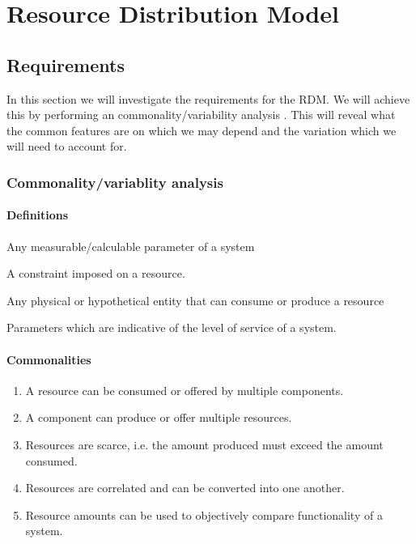 \newcommand{\rdmid}{2}
\chapter{Resource Distribution Model}
\section{Requirements}
In this section we will investigate the requirements for the RDM. We will achieve this by performing an commonality/variability analysis \cite{var_invar}. This will reveal what the common features are on which we may depend and the variation which we will need to account for.
\subsection{Commonality/variablity analysis}
\subsubsection{Definitions}
\begin{description}
\nospace
\item[Resource:] Any measurable/calculable parameter of a system
\item[Resource constraint:] A constraint imposed on a resource.
\item[Component:] Any physical or hypothetical entity that can consume or produce a resource
\item[Quality of Service (QoS):] Parameters which are indicative of the level of service of a system.
\end{description}
\subsubsection{Commonalities}
\begin{enumerate}[label=C\rdmid .\arabic*]
\nospace
\item \label{c:1resource_multiplex} A resource can be consumed or offered by multiple components.
\item \label{c:2component_multiplex} A component can produce or offer multiple resources.
\item \label{c:3scarce} Resources are scarce, i.e. the amount produced must exceed the amount consumed.
\item \label{c:4res_transf} Resources are correlated and can be converted into one another.
\item \label{c:5optimize} Resource amounts can be used to objectively compare functionality of a system.
\end{enumerate}


